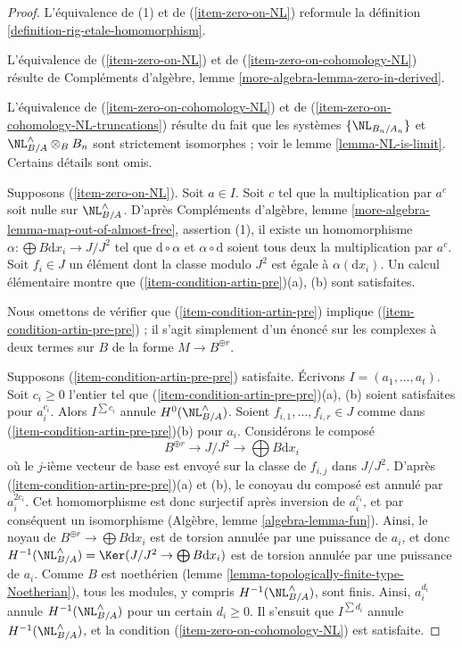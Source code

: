\begin{proof}
L'équivalence de (1) et de (\ref{item-zero-on-NL}) reformule la définition
\ref{definition-rig-etale-homomorphism}.

\medskip\noindent
L'équivalence de (\ref{item-zero-on-NL}) et de
(\ref{item-zero-on-cohomology-NL}) résulte de Compléments d'algèbre, lemme
\ref{more-algebra-lemma-zero-in-derived}.

\medskip\noindent
L'équivalence de (\ref{item-zero-on-cohomology-NL}) et de
(\ref{item-zero-on-cohomology-NL-truncations}) résulte du fait que les systèmes
$\{\NL_{B_n/A_n}\}$ et $\NL_{B/A}^\wedge \otimes_B B_n$ sont strictement
isomorphes ; voir le lemme \ref{lemma-NL-is-limit}. Certains détails sont omis.

\medskip\noindent
Supposons (\ref{item-zero-on-NL}). Soit $a \in I$. Soit $c$ tel que la
multiplication par $a^c$ soit nulle sur $\NL_{B/A}^\wedge$. D'après
Compléments d'algèbre, lemme
\ref{more-algebra-lemma-map-out-of-almost-free}, assertion (1), il existe un
homomorphisme $\alpha : \bigoplus B\text{d}x_i \to J/J^2$ tel que
$\text{d} \circ \alpha$ et $\alpha \circ \text{d}$ soient tous deux la
multiplication par $a^c$. Soit $f_i \in J$ un élément dont la classe modulo
$J^2$ est égale à $\alpha(\text{d}x_i)$. Un calcul élémentaire montre que
(\ref{item-condition-artin-pre})(a), (b) sont satisfaites.

\medskip\noindent
Nous omettons de vérifier que (\ref{item-condition-artin-pre}) implique
(\ref{item-condition-artin-pre-pre}) ; il s'agit simplement d'un énoncé sur
les complexes à deux termes sur $B$ de la forme $M \to B^{\oplus r}$.

\medskip\noindent
Supposons (\ref{item-condition-artin-pre-pre}) satisfaite. Écrivons
$I = (a_1, \ldots, a_t)$. Soit $c_i \geq 0$ l'entier tel que
(\ref{item-condition-artin-pre-pre})(a), (b) soient satisfaites pour
$a_i^{c_i}$. Alors $I^{\sum c_i}$ annule $H^0(\NL_{B/A}^\wedge)$. Soient
$f_{i, 1}, \ldots, f_{i, r} \in J$ comme dans
(\ref{item-condition-artin-pre-pre})(b) pour $a_i$. Considérons le composé
$$
B^{\oplus r} \to J/J^2 \to \bigoplus B\text{d}x_i
$$
où le $j$-ième vecteur de base est envoyé sur la classe de $f_{i, j}$ dans
$J/J^2$. D'après (\ref{item-condition-artin-pre-pre})(a) et (b), le conoyau du
composé est annulé par $a_i^{2c_i}$. Cet homomorphisme est donc surjectif après
inversion de $a_i^{c_i}$, et par conséquent un isomorphisme (Algèbre, lemme
\ref{algebra-lemma-fun}). Ainsi, le noyau de
$B^{\oplus r} \to \bigoplus B\text{d}x_i$ est de torsion annulée par une
puissance de $a_i$, et donc
$H^{-1}(\NL_{B/A}^\wedge) = \Ker(J/J^2 \to \bigoplus B\text{d}x_i)$
est de torsion annulée par une puissance de $a_i$. Comme $B$ est noethérien
(lemme \ref{lemma-topologically-finite-type-Noetherian}), tous les modules, y
compris $H^{-1}(\NL_{B/A}^\wedge)$, sont finis. Ainsi, $a_i^{d_i}$ annule
$H^{-1}(\NL_{B/A}^\wedge)$ pour un certain $d_i \geq 0$. Il s'ensuit que
$I^{\sum d_i}$ annule $H^{-1}(\NL_{B/A}^\wedge)$, et la condition
(\ref{item-zero-on-cohomology-NL}) est satisfaite.


\end{proof}
